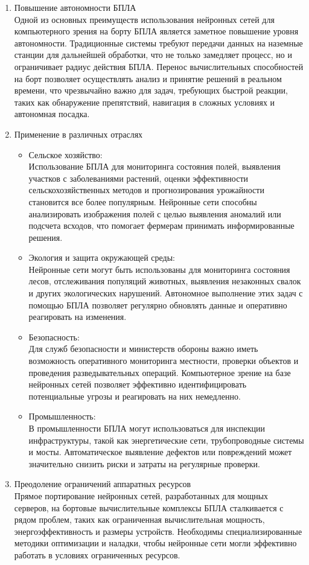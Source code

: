     \begin{enumerate}
        \item Повышение автономности БПЛА \\
        Одной из основных преимуществ использования нейронных сетей для компьютерного зрения на борту БПЛА является заметное повышение уровня автономности. Традиционные системы требуют передачи данных на наземные станции для дальнейшей обработки, что не только замедляет процесс, но и ограничивает радиус действия БПЛА. Перенос вычислительных способностей на борт позволяет осуществлять анализ и принятие решений в реальном времени, что чрезвычайно важно для задач, требующих быстрой реакции, таких как обнаружение препятствий, навигация в сложных условиях и автономная посадка.
        \item Применение в различных отраслях
            \begin{itemize}
                \item Сельское хозяйство: \\
                Использование БПЛА для мониторинга состояния полей, выявления участков с заболеваниями растений, оценки эффективности сельскохозяйственных методов и прогнозирования урожайности становится все более популярным. Нейронные сети способны анализировать изображения полей с целью выявления аномалий или подсчета всходов, что помогает фермерам принимать информированные решения.
                \item Экология и защита окружающей среды: \\
                Нейронные сети могут быть использованы для мониторинга состояния лесов, отслеживания популяций животных, выявления незаконных свалок и других экологических нарушений. Автономное выполнение этих задач с помощью БПЛА позволяет регулярно обновлять данные и оперативно реагировать на изменения.
                \item Безопасность: \\
                Для служб безопасности и министерств обороны важно иметь возможность оперативного мониторинга местности, проверки объектов и проведения разведывательных операций. Компьютерное зрение на базе нейронных сетей позволяет эффективно идентифицировать потенциальные угрозы и реагировать на них немедленно.
                \item Промышленность: \\
                В промышленности БПЛА могут использоваться для инспекции инфраструктуры, такой как энергетические сети, трубопроводные системы и мосты. Автоматическое выявление дефектов или повреждений может значительно снизить риски и затраты на регулярные проверки.
            \end{itemize}
        \item Преодоление ограничений аппаратных ресурсов \\
        Прямое портирование нейронных сетей, разработанных для мощных серверов, на бортовые вычислительные комплексы БПЛА сталкивается с рядом проблем, таких как ограниченная вычислительная мощность, энергоэффективность и размеры устройств. Необходимы специализированные методики оптимизации и наладки, чтобы нейронные сети могли эффективно работать в условиях ограниченных ресурсов.
    \end{enumerate}


